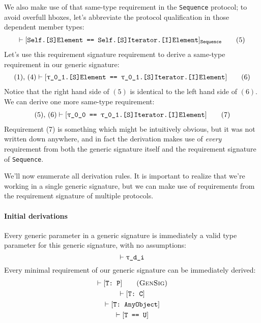 \documentclass[../generics]{subfiles}
\begin{document}
We also make use of that same-type requirement in the \texttt{Sequence} protocol; to avoid overfull hboxes, let's abbreviate the protocol qualification in those dependent member types:
\begin{gather}
\vdash[\texttt{Self.[S]Element == Self.[S]Iterator.[I]Element}]_\texttt{Sequence}\tag{5}
\end{gather}
Let's use this requirement signature requirement to derive a same-type requirement in our generic signature:
\begin{gather}
(1),\,(4)\vdash[\texttt{\texttt{$\uptau$\_0\_1}.[S]Element == \texttt{$\uptau$\_0\_1}.[S]Iterator.[I]Element}]\tag{6}
\end{gather}
Notice that the right hand side of $(5)$ is identical to the left hand side of $(6)$. We can derive one more same-type requirement:
\begin{gather}
(5),\,(6)\vdash[\texttt{\texttt{$\uptau$\_0\_0} == \texttt{$\uptau$\_0\_1}.[S]Iterator.[I]Element}]\tag{7}
\end{gather}
Requirement (7) is something which might be intuitively obvious, but it was not written down anywhere, and in fact the derivation makes use of \emph{every} requirement from both the generic signature itself and the requirement signature of \texttt{Sequence}.

We'll now enumerate all derivation rules. It is important to realize that we're working in a single generic signature, but we can make use of requirements from the requirement signature of multiple protocols.

\paragraph{Initial derivations}
Every generic parameter in a generic signature is immediately a valid type parameter for this generic signature, with no assumptions:
\[\vdash\texttt{$\uptau$\_d\_i}\]
Every minimal requirement of our generic signature can be immediately derived:
\begin{gather*}
\vdash\ConfReq{T}{P}\tag{\textsc{GenSig}}\\
\vdash\ConfReq{T}{C}\\
\vdash\ConfReq{T}{AnyObject}\\
\vdash\FormalReq{T == U}
\end{gather*}
\end{document}
